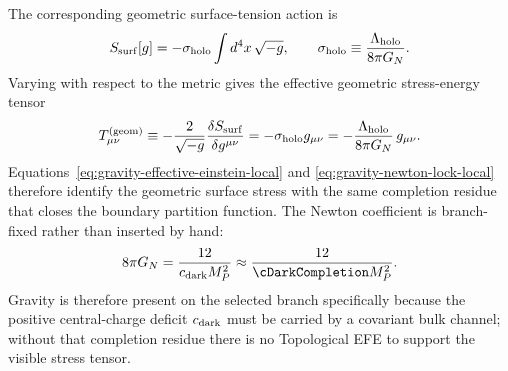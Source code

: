 \documentclass[11pt]{article}
\begin{document}
The corresponding geometric surface-tension action is
\begin{equation}
\label{eq:gravity-surface-action}
 S_{\rm surf}[g]
 =
 -\sigma_{\rm holo}\int d^4x\,\sqrt{-g},
 \qquad
 \sigma_{\rm holo}\equiv\frac{\Lambda_{\rm holo}}{8\pi G_N}.
\end{equation}
Varying with respect to the metric gives the effective geometric stress-energy tensor
\begin{equation}
\label{eq:gravity-geom-stress}
 T_{\mu\nu}^{(\mathrm{geom})}
 \equiv
 -\frac{2}{\sqrt{-g}}\frac{\delta S_{\rm surf}}{\delta g^{\mu\nu}}
 =
 -\sigma_{\rm holo}g_{\mu\nu}
 =
 -\frac{\Lambda_{\rm holo}}{8\pi G_N}\,g_{\mu\nu}.
\end{equation}
Equations~\eqref{eq:gravity-effective-einstein-local} and
\eqref{eq:gravity-newton-lock-local} therefore identify the geometric surface
stress with the same completion residue that closes the boundary partition
function. The Newton coefficient is branch-fixed rather than inserted by hand:
\begin{equation}
\label{eq:gravity-newton-lock-restated}
 8\pi G_N
 =
 \frac{12}{c_{\rm dark}M_P^2}
 \approx
 \frac{12}{\cDarkCompletion M_P^2}.
\end{equation}
Gravity is therefore present on the selected branch specifically because the
positive central-charge deficit $c_{\rm dark}$ must be carried by a covariant
bulk channel; without that completion residue there is no Topological EFE to
support the visible stress tensor.
\end{document}

